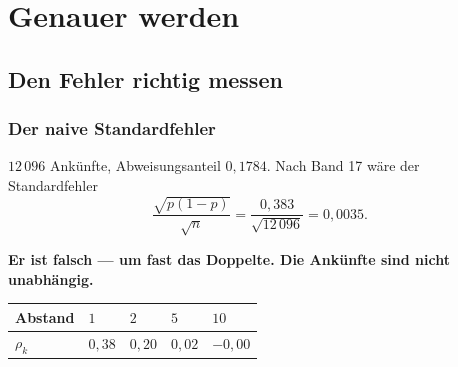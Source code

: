 \part{Genauer werden}

\chapter{Den Fehler richtig messen}

\section{Der naive Standardfehler}

\begin{merksatz}
$12\,096$ Ankünfte, Abweisungsanteil $0{,}1784$. Nach Band 17 wäre der Standardfehler
\[ \frac{\sqrt{p(1-p)}}{\sqrt n} = \frac{0{,}383}{\sqrt{12\,096}} = 0{,}0035 . \]

\begin{center}
\begin{minipage}{0.9\textwidth}
\textbf{Er ist falsch --- um fast das Doppelte. Die Ankünfte sind nicht unabhängig.}
\end{minipage}
\end{center}

\begin{center}
{\small
\renewcommand{\arraystretch}{1.48}
\begin{tabular}{@{}P{1.4cm}P{1.4cm}P{1.4cm}P{1.4cm}P{1.4cm}@{}}
\toprule
\textbf{Abstand} & $1$ & $2$ & $5$ & $10$\\
\midrule
$\rho_k$ & $0{,}38$ & $0{,}20$ & $0{,}02$ & $-0{,}00$\\
\bottomrule
\end{tabular}}
\end{center}

\begin{center}
\begin{minipage}{0.88\textwidth}
\end{minipage}
\end{center}
\end{merksatz}


